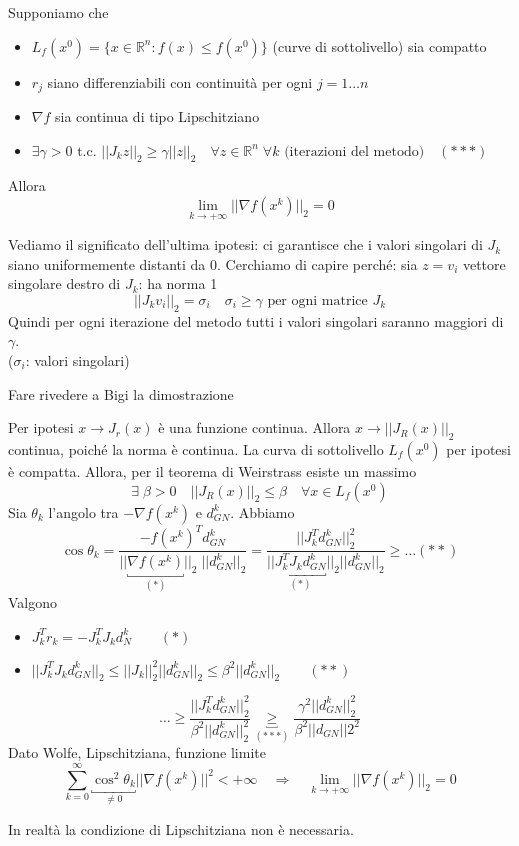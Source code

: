 \begin{theo}
Supponiamo che 
\begin{itemize}
\item $L_f(x^{0}) = \{ x \in \mathbb{R}^{n} : f(x) \leq f(x^{0}) \}$
     (curve di sottolivello) sia compatto
\item $r_j$ siano differenziabili con continuit\`a  per ogni $j=1\ldots n$
 \item $\nabla f$ sia continua di tipo Lipschitziano
\item $\exists \gamma > 0  \text{ t.c. } || J_kz||_{2} \geq \gamma ||z||_{2} 
\quad \forall z \in \mathbb{R}^{n} \; \forall k \text{ (iterazioni del metodo)} \quad (***)$ 
\end{itemize}
Allora 
$$ \lim_{k \to +\infty} || \nabla f(x^{k})||_{2} = 0 $$
\end{theo}
Vediamo il significato dell'ultima ipotesi:
ci garantisce che i valori singolari di $J_k$ siano uniformemente
distanti da 0.
Cerchiamo di capire perch\'e: sia
$ z=v_i $ vettore singolare destro di $J_k$: ha norma 1
$$ || J_k v_i||_{2} = \sigma_i \quad \sigma_i \geq \gamma \text{ per ogni
matrice } J_k $$
Quindi per ogni iterazione del metodo tutti i valori singolari saranno maggiori di $\gamma$.
\\
($\sigma_i$: valori singolari)
\begin{thproof}
\begin{todo}
Fare rivedere a Bigi la dimostrazione
\end{todo}
Per ipotesi $x \rightarrow J_r(x)$ è una funzione continua.
Allora $x \rightarrow || J_R(x)||_{2}$ continua, poich\'e
la norma \`e continua.
La curva di sottolivello $L_{f}(x^{0})$  per ipotesi \`e compatta.
Allora, per il teorema di Weirstrass esiste un massimo
$$ \exists \; \beta > 0 \quad 
|| J_{R}(x)||_{2} \leq \beta \quad \forall x \in L_f(x^{0}) 
$$
Sia $\theta_k$ l'angolo tra $-\nabla f(x^{k})$ e $d_{GN}^{k}$.
Abbiamo
$$ \cos \theta_{k} = 
\frac{-f(x^{k})^{T}d_{GN}^{k}}{|| \underbracket{\nabla f(x^{k})}_{(*)}||_{2} 
\; ||d_{GN}^{k}||_{2}} =
 \frac{|| J_{k}^{T}d_{GN}^{k} ||_{2}^{2} }{|| \underbracket{J_{k}^{T}J_k d_{GN}^{k}}_{(*)}||_{2}
||d_{GN}^{k}||_{2} } \geq \ldots (**)
$$
Valgono
\begin{itemize}
\item $ J_k^{T}r_k = -J_k^{T}J_{k}d_N^{k} \qquad (*)$
\item 
$
 || J_k^{T} J_k d_{GN}^{k}||_{2} \leq || J_{k} ||_{2}^{2}||d_{GN}^{k}||_{2}
\leq \beta^{2} ||d_{GN}^{k}||_{2} \qquad (**)
$
\end{itemize}
$$ \ldots \geq
\frac{|| J_k^{T} d_{GN}^{k}||_{2}^{2}}{\beta^{2} ||d^{k}_{GN}||_{2}^{2}}
\underbracket{\geq}_{(***)} \frac{\gamma^{2}||d_{GN}^{k}||_{2}^{2}}{\beta^{2} ||d_{GN}||{2}^{2}}$$
Dato Wolfe, Lipschitziana, funzione limite 
$$
\displaystyle \sum_{k=0}^{\infty} \underbracket{\cos^{2} \theta_k}_{\neq 0} || \nabla f(x^{k})||^{2} < + \infty \quad \Longrightarrow \quad \lim_{k \to + \infty} || \nabla f(x^{k})||_{2} = 0$$
\end{thproof}
In realt\`a  la condizione di Lipschitziana non è necessaria.



